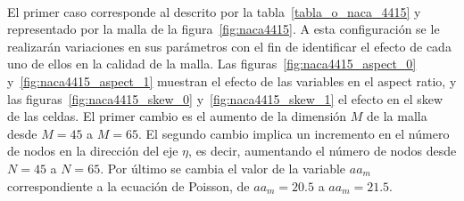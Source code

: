 \documentclass[letterpaper, openright, 12pt]{book}
\begin{document}
    \paragraph*{}
    El primer caso corresponde al descrito por la tabla~\ref{tabla_o_naca_4415}
    y representado por la malla de la figura~\ref{fig:naca4415}. A esta
    configuración se le realizarán variaciones en sus parámetros con el fin de
    identificar el efecto de cada uno de ellos en la calidad de la malla. Las
    figuras~\ref{fig:naca4415_aspect_0} y~\ref{fig:naca4415_aspect_1}  muestran
    el efecto de las variables en el aspect ratio, y las
    figuras~\ref{fig:naca4415_skew_0} y~\ref{fig:naca4415_skew_1} el efecto en
    el skew de las celdas. El primer cambio es
    el aumento de la dimensión $M$ de la malla desde $M=45$ a $M=65$. El segundo
    cambio implica un incremento en el número de nodos en la dirección del eje
    $\eta$, es decir, aumentando el número de nodos desde $N=45$ a $N=65$. Por
    último se cambia el valor de la variable $aa_m$ correspondiente a la
    ecuación de Poisson, de $aa_m = 20.5$ a $aa_m=21.5$.
\end{document}
